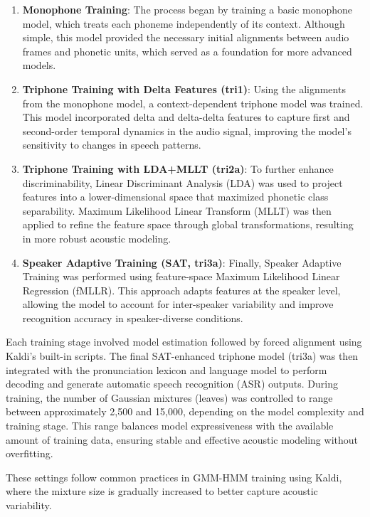 \begin{enumerate}
    \item \textbf{Monophone Training}: The process began by training a basic monophone model, which treats each phoneme independently of its context. Although simple, this model provided the necessary initial alignments between audio frames and phonetic units, which served as a foundation for more advanced models.

    \item \textbf{Triphone Training with Delta Features (tri1)}: Using the alignments from the monophone model, a context-dependent triphone model was trained. This model incorporated delta and delta-delta features to capture first and second-order temporal dynamics in the audio signal, improving the model’s sensitivity to changes in speech patterns.

    \item \textbf{Triphone Training with LDA+MLLT (tri2a)}: To further enhance discriminability, Linear Discriminant Analysis (LDA) was used to project features into a lower-dimensional space that maximized phonetic class separability. Maximum Likelihood Linear Transform (MLLT) was then applied to refine the feature space through global transformations, resulting in more robust acoustic modeling.

    \item \textbf{Speaker Adaptive Training (SAT, tri3a)}: Finally, Speaker Adaptive Training was performed using feature-space Maximum Likelihood Linear Regression (fMLLR). This approach adapts features at the speaker level, allowing the model to account for inter-speaker variability and improve recognition accuracy in speaker-diverse conditions.
\end{enumerate}
Each training stage involved model estimation followed by forced alignment using Kaldi’s built-in scripts. The final SAT-enhanced triphone model (tri3a) was then integrated with the pronunciation lexicon and language model to perform decoding and generate automatic speech recognition (ASR) outputs. During training, the number of Gaussian mixtures (leaves) was controlled to range between approximately 2,500 and 15,000, depending on the model complexity and training stage. This range balances model expressiveness with the available amount of training data, ensuring stable and effective acoustic modeling without overfitting.

These settings follow common practices in GMM-HMM training using Kaldi, where the mixture size is gradually increased to better capture acoustic variability.

